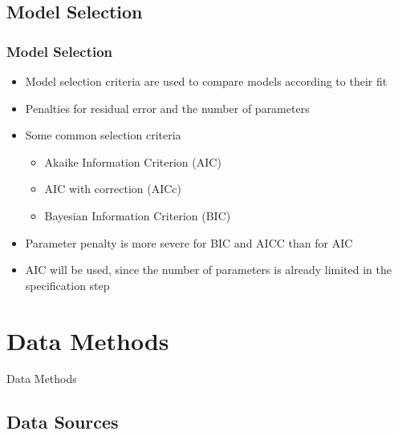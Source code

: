 \documentclass[presentation]{beamer}
\begin{document}
\subsection{Model Selection}

\begin{frame}[t]
\frametitle{Model Selection}
\begin{itemize}
\item{Model selection criteria are used to compare models according to their fit}
\item{Penalties for residual error and the number of parameters}
\item{Some common selection criteria
  \begin{itemize}
  \item{Akaike Information Criterion (AIC)}
  \item{AIC with correction (AICc)}
  \item{Bayesian Information Criterion (BIC)}
  \end{itemize}
}
\item{Parameter penalty is more severe for BIC and AICC than for AIC \cite{bisgaard2011time}}
\item{AIC will be used, since the number of parameters is already limited in the specification step}
\end{itemize}
\end{frame}

\section{Data Methods}

\begin{frame}
\begin{center}
\Large{Data Methods}
\end{center}
\end{frame}


\subsection{Data Sources}
\end{document}
